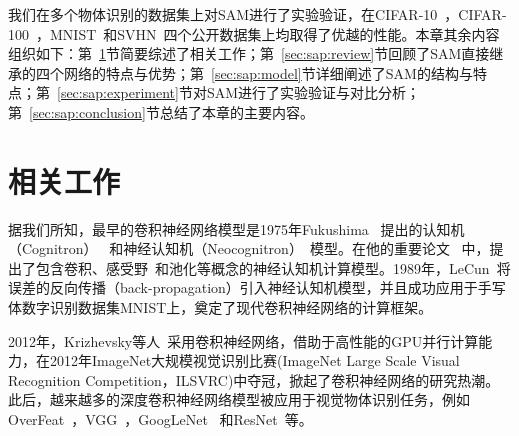 我们在多个物体识别的数据集上对SAM进行了实验验证，在CIFAR-10~\cite{krizhevsky2009learning}，CIFAR-100~\cite{krizhevsky2009learning}，MNIST~\cite{lecun1998gradient}和SVHN~\cite{netzer2011reading}四个公开数据集上均取得了优越的性能。本章其余内容组织如下：第~\ref{sec:sap:ralate}节简要综述了相关工作；第~\ref{sec:sap:review}节回顾了SAM直接继承的四个网络的特点与优势；第~\ref{sec:sap:model}节详细阐述了SAM的结构与特点；第~\ref{sec:sap:experiment}节对SAM进行了实验验证与对比分析；第~\ref{sec:sap:conclusion}节总结了本章的主要内容。


\section{相关工作}
\label{sec:sap:ralate}

据我们所知，最早的卷积神经网络模型是1975年Fukushima~\cite{fukushima1982neocognitron} 提出的认知机（Cognitron）~\cite{fukushima1975cognitron} 和神经认知机（Neocognitron）~\cite{fukushima1980neocognitron}模型。在他的重要论文~\cite{fukushima1982neocognitron} 中，提出了包含卷积、感受野~\cite{hubel1959receptive, hubel1962receptive}和池化等概念的神经认知机计算模型。1989年，LeCun~\cite{le1988theoretical, lecun1989backpropagation, le1990handwritten}将误差的反向传播（back-propagation）引入神经认知机模型，并且成功应用于手写体数字识别数据集MNIST上，奠定了现代卷积神经网络的计算框架。

2012年，Krizhevsky等人~\cite{krizhevsky2012imagenet}采用卷积神经网络，借助于高性能的GPU并行计算能力，在2012年ImageNet大规模视觉识别比赛(ImageNet Large Scale Visual Recognition Competition，ILSVRC)中夺冠，掀起了卷积神经网络的研究热潮。此后，越来越多的深度卷积神经网络模型被应用于视觉物体识别任务，例如OverFeat~\cite{sermanet2013overfeat}，VGG~\cite{simonyan2014very}，GoogLeNet~\cite{szegedy2014going,szegedy2015rethinking,szegedy2016inception} 和ResNet~\cite{he2015deep}等。

